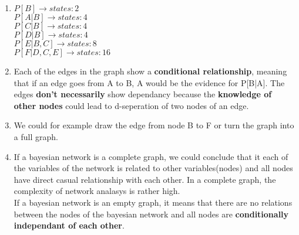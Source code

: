 \noindent

\begin{enumerate}
    \item \phantom{text}
          \begin{latin}        \noindent
              $P[B] \rightarrow states : 2$\\
              $P[A|B]\rightarrow states : 4$\\
              $P[C|B]\rightarrow states : 4$\\
              $P[D|B] \rightarrow states: 4$\\
              $P[E|B,C] \rightarrow states : 8$\\
              $P[F|D,C,E] \rightarrow states : 16$
          \end{latin}
    \item \phantom{text}
          \begin{latin} \noindent
              Each of the edges in the graph show a \textbf{conditional relationship}, meaning that if an edge goes from A to B, A would be the evidence for P[B|A]. The
              edges \textbf{don't necessarily} show dependancy because the \textbf{knowledge of other nodes} could lead to d-seperation of two nodes of an edge.
          \end{latin}
    \item \phantom{text}
          \begin{latin} \noindent
              We could for example draw the edge from node B to F or turn the graph into a full graph.
          \end{latin}
    \item \phantom{text}
          \begin{latin} \noindent
              If a bayesian network is a complete graph, we could conclude that it each of the variables of the network is related to other variables(nodes) and all nodes have direct casual relationship with each other. In a complete graph, the complexity of network analasys is rather high.\\
              If a bayesian network is an empty graph, it means that there are no relations between the nodes of the bayesian network and all nodes are \textbf{conditionally independant of each other}.  
          \end{latin}
\end{enumerate}